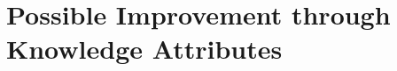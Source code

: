 \section{Possible Improvement through Knowledge Attributes}
\label{sec:approach:knowledge_attributes}
